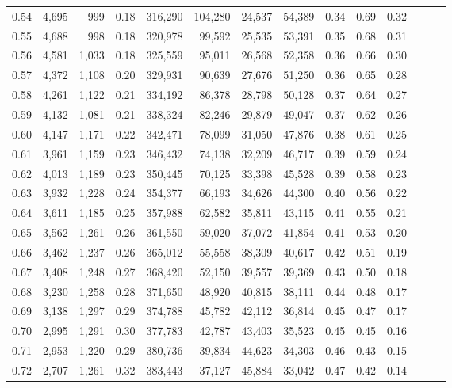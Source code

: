 \begin{tabular}{rrrrrrrrrrrrrr}
0.54 &  4,695 &    999 &  0.18 &  316,290 &  104,280 &  24,537 &  54,389 &  0.34 &  0.69 &      0.32 \\
0.55 &  4,688 &    998 &  0.18 &  320,978 &   99,592 &  25,535 &  53,391 &  0.35 &  0.68 &      0.31 \\
0.56 &  4,581 &  1,033 &  0.18 &  325,559 &   95,011 &  26,568 &  52,358 &  0.36 &  0.66 &      0.30 \\
0.57 &  4,372 &  1,108 &  0.20 &  329,931 &   90,639 &  27,676 &  51,250 &  0.36 &  0.65 &      0.28 \\
0.58 &  4,261 &  1,122 &  0.21 &  334,192 &   86,378 &  28,798 &  50,128 &  0.37 &  0.64 &      0.27 \\
0.59 &  4,132 &  1,081 &  0.21 &  338,324 &   82,246 &  29,879 &  49,047 &  0.37 &  0.62 &      0.26 \\
0.60 &  4,147 &  1,171 &  0.22 &  342,471 &   78,099 &  31,050 &  47,876 &  0.38 &  0.61 &      0.25 \\
0.61 &  3,961 &  1,159 &  0.23 &  346,432 &   74,138 &  32,209 &  46,717 &  0.39 &  0.59 &      0.24 \\
0.62 &  4,013 &  1,189 &  0.23 &  350,445 &   70,125 &  33,398 &  45,528 &  0.39 &  0.58 &      0.23 \\
0.63 &  3,932 &  1,228 &  0.24 &  354,377 &   66,193 &  34,626 &  44,300 &  0.40 &  0.56 &      0.22 \\
0.64 &  3,611 &  1,185 &  0.25 &  357,988 &   62,582 &  35,811 &  43,115 &  0.41 &  0.55 &      0.21 \\
0.65 &  3,562 &  1,261 &  0.26 &  361,550 &   59,020 &  37,072 &  41,854 &  0.41 &  0.53 &      0.20 \\
0.66 &  3,462 &  1,237 &  0.26 &  365,012 &   55,558 &  38,309 &  40,617 &  0.42 &  0.51 &      0.19 \\
0.67 &  3,408 &  1,248 &  0.27 &  368,420 &   52,150 &  39,557 &  39,369 &  0.43 &  0.50 &      0.18 \\
0.68 &  3,230 &  1,258 &  0.28 &  371,650 &   48,920 &  40,815 &  38,111 &  0.44 &  0.48 &      0.17 \\
0.69 &  3,138 &  1,297 &  0.29 &  374,788 &   45,782 &  42,112 &  36,814 &  0.45 &  0.47 &      0.17 \\
0.70 &  2,995 &  1,291 &  0.30 &  377,783 &   42,787 &  43,403 &  35,523 &  0.45 &  0.45 &      0.16 \\
0.71 &  2,953 &  1,220 &  0.29 &  380,736 &   39,834 &  44,623 &  34,303 &  0.46 &  0.43 &      0.15 \\
0.72 &  2,707 &  1,261 &  0.32 &  383,443 &   37,127 &  45,884 &  33,042 &  0.47 &  0.42 &      0.14 \\

\end{tabular}
